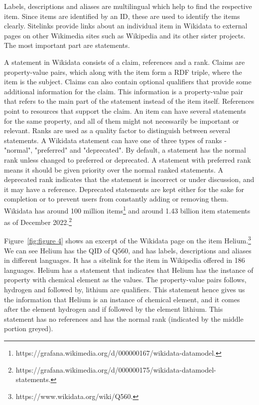 Labels, descriptions and aliases are multilingual which help to find the respective item. Since items are identified by an ID, these are used to identify the items clearly. Sitelinks provide links about an individual item in Wikidata to external pages on other Wikimedia sites such as Wikipedia and its other sister projects. The most important part are statements. 

A statement in Wikidata consists of a claim, references and a rank. Claims are property-value pairs, which along with the item form a RDF triple, where the item is the subject. Claims can also contain optional qualifiers that provide some additional information for the claim. This information is a property-value pair that refers to the main part of the statement instead of the item itself\cite{Erxleben2014}. References point to resources that support the claim. An item can have several statements for the same property, and all of them might not necessarily be important or relevant. Ranks are used as a quality factor to distinguish between several statements. A Wikidata statement can have one of three types of ranks - "normal", "preferred" and "deprecated". By default, a statement has the normal rank unless changed to preferred or deprecated. A statement with preferred rank means it should be given priority over the normal ranked statements. A deprecated rank indicates that the statement is incorrect or under discussion, and it may have a reference. Deprecated statements are kept either for the sake for completion or to prevent users from constantly adding or removing them. Wikidata has around 100 million items\footnote{https://grafana.wikimedia.org/d/000000167/wikidata-datamodel.} and around 1.43 billion item statements as of December 2022.\footnote{https://grafana.wikimedia.org/d/000000175/wikidata-datamodel-statements.}

Figure~\ref{fig:figure 4} shows an excerpt of the Wikidata page on the item Helium.\footnote{https://www.wikidata.org/wiki/Q560.} We can see Helium has the QID of Q560, and has labels, descriptions and aliases in different languages. It has a sitelink for the item in Wikipedia offered in 186 languages. Helium has a statement that indicates that Helium has the instance of property with chemical element as the values. The property-value pairs follows, hydrogen and followed by, lithium are qualifiers. This statement hence gives us the information that Helium is an instance of chemical element, and it comes after the element hydrogen and if followed by the element lithium. This statement has no references and has the normal rank (indicated by the middle portion greyed).


